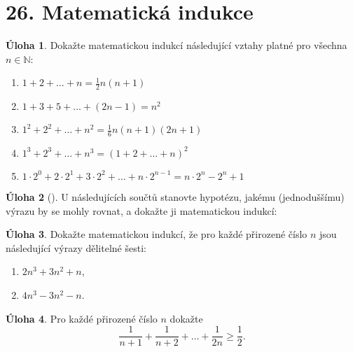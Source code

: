 \documentclass[8pt,a5paper]{extarticle}
\newcommand{\N}{\mathbb{N}}
\def\tisk{%
\newbox\shipouthackbox
\pdfpagewidth=2\pdfpagewidth
\let\oldshipout=\shipout
\def\shipout{\afterassignment\zdvojtmp \setbox\shipouthackbox=}%
\def\zdvojtmp{\aftergroup\zdvoj}%
\def\zdvoj{%
     \oldshipout\vbox{\hbox{%
        \copy\shipouthackbox
        \hskip\dimexpr .5\pdfpagewidth-\wd\shipouthackbox\relax
        \box\shipouthackbox
    }}%
}}%
\let\results\newpage
\let\endresults\relax
\def\resultssame{%
    \long\def\results##1\endresults{%
        \vfill
        \noindent\rotatebox{180}{\vbox{##1}}%
    }%
}
\theoremstyle{definition}
\newtheorem{uloha}{\atr Úloha}
\let\ee\expandafter
\def\locvysl#1{\ee\gdef\ee\locvysld\ee{\locvysld\item #1}}
\let\lv\locvysl
\newenvironment{ulohav}[1][]{\begin{uloha}[#1]\gdef\locvysld{\begin{enumerate*}}}{\ee\vyslplain\ee{\locvysld\end{enumerate*}}\end{uloha}}
\def\atr{}
\begin{document}

\section*{26. Matematická indukce}

\begin{uloha}
Dokažte matematickou indukcí následující vztahy platné pro všechna $n \in \N$:
\begin{enumerate}
    \item $1 + 2 + \dots + n = \frac12n(n+1)$
    \item $1 + 3 + 5 + \dots + (2n-1) = n^2$
    \item $1^2 + 2^2 + \dots + n^2 = \frac16n(n+1)(2n+1)$
    \item $1^3 + 2^3 + \dots + n^3 = (1 + 2 + \dots + n)^2$
    \item $1 \cdot 2^0 + 2 \cdot 2^1 + 3 \cdot 2^2 + \dots + n \cdot 2^{n-1} = n \cdot 2^n - 2^n + 1$
\end{enumerate}
\end{uloha}

\begin{ulohav}
U následujících součtů stanovte hypotézu, jakému (jednoduššímu) výrazu by se mohly rovnat, a dokažte ji matematickou indukcí:
\end{ulohav}

\begin{uloha}
Dokažte matematickou indukcí, že pro každé přirozené číslo $n$ jsou následující výrazy dělitelné šesti:
\begin{enumerate}
    \item $2n^3 + 3n^2 + n$,
    \item $4 n^3-3 n^2-n$.
\end{enumerate}
\end{uloha}

\begin{uloha}
Pro každé přirozené číslo $n$ dokažte
\[ \frac{1}{n+1} + \frac{1}{n+2} + \dots + \frac{1}{2n} \geq \frac12. \]
\end{uloha}
\end{document}
